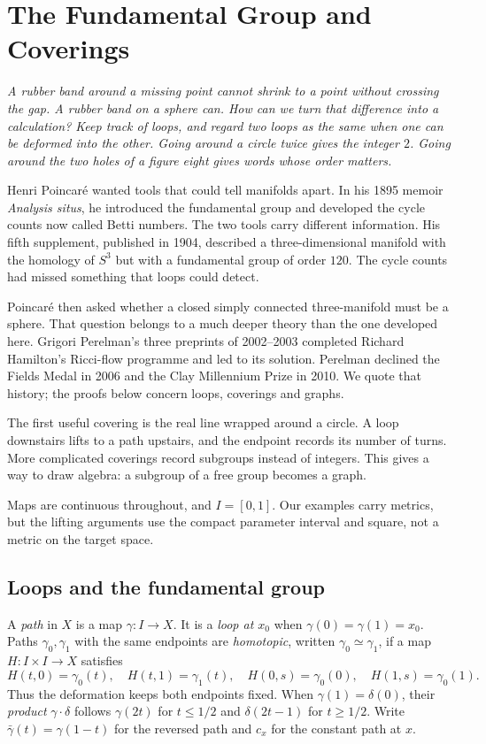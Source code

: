 \chapter{The Fundamental Group and Coverings}

\begin{center}\itshape
A rubber band around a missing point cannot shrink to a point without crossing the gap. A rubber band on a sphere can. How can we turn that difference into a calculation? Keep track of loops, and regard two loops as the same when one can be deformed into the other. Going around a circle twice gives the integer $2$. Going around the two holes of a figure eight gives words whose order matters.
\end{center}

Henri Poincar\'e wanted tools that could tell manifolds apart. In his 1895 memoir \emph{Analysis situs}, he introduced the fundamental group and developed the cycle counts now called Betti numbers. The two tools carry different information. His fifth supplement, published in 1904, described a three-dimensional manifold with the homology of $S^3$ but with a fundamental group of order $120$. The cycle counts had missed something that loops could detect.

Poincar\'e then asked whether a closed simply connected three-manifold must be a sphere. That question belongs to a much deeper theory than the one developed here. Grigori Perelman's three preprints of 2002--2003 completed Richard Hamilton's Ricci-flow programme and led to its solution. Perelman declined the Fields Medal in 2006 and the Clay Millennium Prize in 2010. We quote that history; the proofs below concern loops, coverings and graphs.

The first useful covering is the real line wrapped around a circle. A loop downstairs lifts to a path upstairs, and the endpoint records its number of turns. More complicated coverings record subgroups instead of integers. This gives a way to draw algebra: a subgroup of a free group becomes a graph.

Maps are continuous throughout, and $I=[0,1]$. Our examples carry metrics, but the lifting arguments use the compact parameter interval and square, not a metric on the target space.

\section{Loops and the fundamental group}

\begin{definition}
A \emph{path} in $X$ is a map $\gamma:I\to X$. It is a \emph{loop at $x_0$} when $\gamma(0)=\gamma(1)=x_0$. Paths $\gamma_0,\gamma_1$ with the same endpoints are \emph{homotopic}, written $\gamma_0\simeq\gamma_1$, if a map $H:I\times I\to X$ satisfies
\[
H(t,0)=\gamma_0(t),\quad H(t,1)=\gamma_1(t),\quad
H(0,s)=\gamma_0(0),\quad H(1,s)=\gamma_0(1).
\]
Thus the deformation keeps both endpoints fixed. When $\gamma(1)=\delta(0)$, their \emph{product} $\gamma\cdot\delta$ follows $\gamma(2t)$ for $t\le1/2$ and $\delta(2t-1)$ for $t\ge1/2$. Write $\bar\gamma(t)=\gamma(1-t)$ for the reversed path and $c_x$ for the constant path at $x$.
\end{definition}


